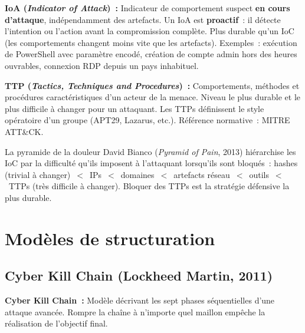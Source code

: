 \begin{boxdef}
\textbf{IoA (\textit{Indicator of Attack})~:} Indicateur de comportement
suspect \textbf{en cours d'attaque}, indépendamment des artefacts.
Un IoA est \textbf{proactif}~: il détecte l'intention ou l'action avant
la compromission complète. Plus durable qu'un IoC (les comportements
changent moins vite que les artefacts).
Exemples~: exécution de PowerShell avec paramètre encodé, création de
compte admin hors des heures ouvrables, connexion RDP depuis un pays
inhabituel.
\end{boxdef}

\begin{boxdef}
\textbf{TTP (\textit{Tactics, Techniques and Procedures})~:}
Comportements, méthodes et procédures caractéristiques d'un acteur
de la menace. Niveau le plus durable et le plus difficile à changer
pour un attaquant. Les TTPs définissent le \og{}style opératoire\fg{}
d'un groupe (APT29, Lazarus, etc.). Référence normative~: MITRE ATT\&CK.
\end{boxdef}

\begin{boiteRemarque}{La pyramide de la douleur}
David Bianco (\textit{Pyramid of Pain}, 2013) hiérarchise les IoC
par la difficulté qu'ils imposent à l'attaquant lorsqu'ils sont
bloqués~: hashes (trivial à changer)~$<$~IPs~$<$~domaines~$<$~artefacts
réseau~$<$~outils~$<$~TTPs (très difficile à changer). Bloquer des TTPs
est la stratégie défensive la plus durable.
\end{boiteRemarque}

\section{Modèles de structuration}
\label{sec:cti-modeles}

\subsection{Cyber Kill Chain (Lockheed Martin, 2011)}

\begin{boxdef}
\textbf{Cyber Kill Chain~:} Modèle décrivant les sept phases séquentielles
d'une attaque avancée. Rompre la chaîne à n'importe quel maillon empêche
la réalisation de l'objectif final.
\end{boxdef}

